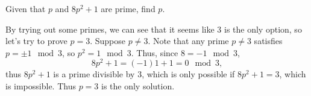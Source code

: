 \documentclass[11pt,dvipsnames]{book}
\numberwithin{figure}{section} %
\numberwithin{table}{section} %
\begin{document}
\begin{exercise} Given that $p$ and $8p^2+1$ are prime, find $p$.

\begin{solution}
By trying out some primes, we can see that it seems like $3$ is the only option, so let's try to prove $p=3$. Suppose $p\neq 3$. Note that any prime $p\neq 3$ satisfies $p = \pm 1 \mod 3$, so $p^2  = 1 \mod 3$. Thus, since $8 = -1\mod 3$,
\[
8p^2+1 = (-1)1+1=0\mod 3,\]
thus $8p^2+1$ is a prime divisible by 3, which is only possible if $8p^2+1=3$, which is impossible. Thus $p=3$ is the only solution.
\end{solution}

\end{exercise}

%
%
%
%
%
%
%
\end{document}
